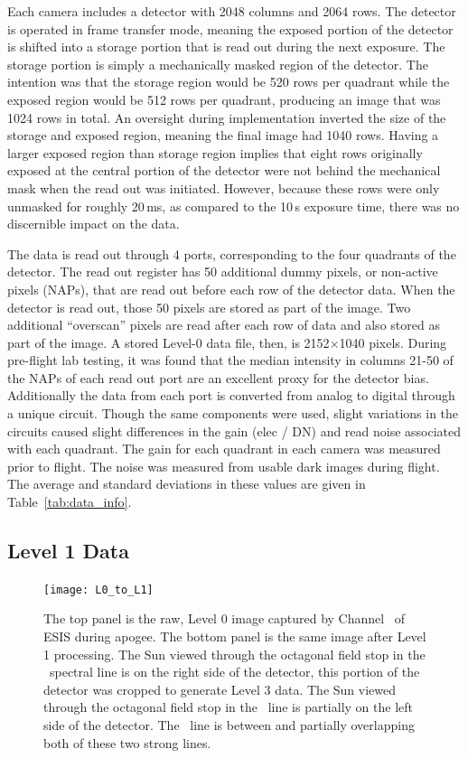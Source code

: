 Each camera includes a detector with 2048 columns and 2064 rows.  The detector is operated in frame transfer mode, meaning the exposed portion of the detector is shifted into a storage portion that is read out during the next exposure. The storage portion is simply a mechanically masked region of the detector. The intention was that the storage region would be 520 rows per quadrant while the exposed region would be 512 rows per quadrant, producing an image that was 1024 rows in total.  An oversight during implementation inverted the size of the storage and exposed region, meaning the final image had 1040 rows.  Having a larger exposed region than storage region implies that eight rows originally exposed at the central portion of the detector were not behind the mechanical mask when the read out was initiated. However, because these rows were only unmasked for roughly 20\,ms, as compared to the 10\,s exposure time, there was no discernible impact on the data. 



The data is read out through 4 ports, corresponding to the four quadrants of the detector.  The read out register has 50 additional dummy pixels, or non-active pixels (NAPs), that are read out before each row of the detector data.  When the detector is read out, those 50 pixels are stored as part of the image.  Two additional ``overscan'' pixels are read after each row of data and also stored as part of the image.  A stored Level-0 data file, then, is 2152$\times$1040 pixels.   During pre-flight lab testing, it was found that the median intensity in columns 21-50 of the NAPs of each read out port are an excellent proxy for the detector bias.  Additionally the data from each port is converted from analog to digital through a unique circuit.  Though the same components were used, slight variations in the circuits caused slight differences in the gain (elec / DN) and read  noise associated with each quadrant.  The gain for each quadrant in each camera was measured prior to flight.  The noise was measured from usable dark images during flight.  The average and standard deviations in these values are given in Table~\ref{tab:data_info}.
    
\subsection{Level 1 Data}
	    \begin{figure}
	    	\centering
	    	\texttt{[image: L0\_to\_L1]}
	    	\caption{The top panel is the raw, Level 0 image captured by Channel \ of ESIS during apogee. The bottom panel is the same image after Level 1 processing. The Sun viewed through the octagonal field stop in the \ov \ spectral line is on the right side of the detector, this portion of the detector was cropped to generate Level 3 data.  The Sun viewed through the octagonal field stop in the \hei \ line is partially on the left side of the detector. The \mgxbright \ line is between and partially overlapping both of these two strong lines.}
	    	\label{fig:L0_to_L1}
	    \end{figure}
    	
